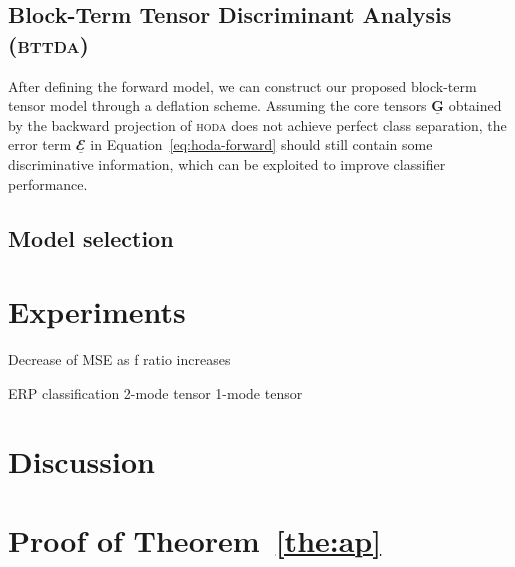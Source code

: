 \documentclass[twocolumn]{article}
\newcommand{\ten}[1]{\underline{\mathbf{#1}}} %
\begin{document}
\subsection{Block-Term Tensor Discriminant Analysis (\textsc{bttda})}
After defining the forward model, we can construct our proposed block-term
tensor model through a deflation scheme. Assuming the core tensors $\ten{G}$
obtained by the backward projection of \textsc{hoda} does not achieve perfect
class separation, the error term $\ten{\mathbfcal{E}}$ in
Equation~\ref{eq:hoda-forward} should still contain some discriminative
information, which can be exploited to improve classifier performance.


\begin{figure*}
	\centering
	
\end{figure*}

\subsection{Model selection}

\section{Experiments}

Decrease of MSE as f ratio increases

ERP classification
2-mode tensor
1-mode tensor

\section{Discussion}


\printbibliography

\appendix
\section{Proof of Theorem~\ref{the:ap}}
\end{document}
